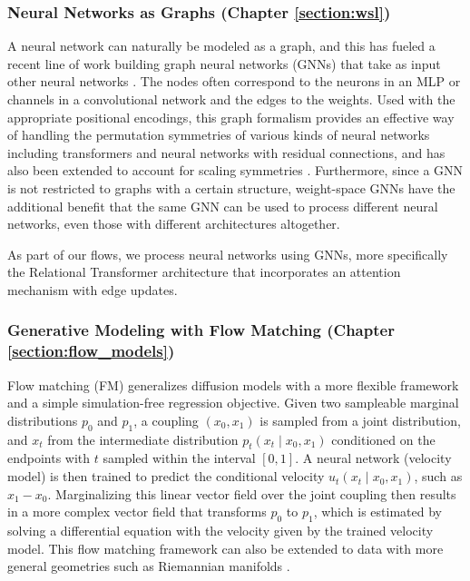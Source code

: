 \subsubsection{Neural Networks as Graphs (Chapter \ref{section:wsl})}

A neural network can naturally be modeled as a graph, and this has fueled a recent line of work building graph neural networks (GNNs) that take as input other neural networks \citep{kofinasGraphNeuralNetworks2024,limGraphMetanetworksProcessing2023,kalogeropoulosScaleEquivariantGraph2024}. The nodes often correspond to the neurons in an MLP or channels in a convolutional network and the edges to the weights. Used with the appropriate positional encodings, this graph formalism provides an effective way of handling the permutation symmetries of various kinds of neural networks including transformers and neural networks with residual connections, and has also been extended to account for scaling symmetries \citep{kalogeropoulosScaleEquivariantGraph2024}. Furthermore, since a GNN is not restricted to graphs with a certain structure, weight-space GNNs have the additional benefit that the same GNN can be used to process different neural networks, even those with different architectures altogether.

As part of our flows, we process neural networks using GNNs, more specifically the Relational Transformer architecture \citep{diaoRelationalAttentionGeneralizing2023,kofinasGraphNeuralNetworks2024} that incorporates an attention mechanism with edge updates. 

\subsubsection{Generative Modeling with Flow Matching (Chapter \ref{section:flow_models})}

Flow matching (FM) \citep{lipmanFlowMatchingGenerative2023,albergoStochasticInterpolantsUnifying2023,liuFlowStraightFast2022,tongImprovingGeneralizingFlowbased2023} generalizes diffusion models with a more flexible framework and a simple simulation-free regression objective. Given two sampleable marginal distributions $p_0$ and $p_1$, a coupling $(x_0, x_1)$ is sampled from a joint distribution, and $x_t$ from the intermediate distribution $p_t(x_t \mid x_0, x_1)$ conditioned on the endpoints with $t$ sampled within the interval $[0,1]$. A neural network (velocity model) is then trained to predict the conditional velocity $u_t(x_t \mid x_0, x_1)$, such as $x_1 - x_0$. Marginalizing this linear vector field over the joint coupling then results in a more complex vector field that transforms $p_0$ to $p_1$, which is estimated by solving a differential equation with the velocity given by the trained velocity model. This flow matching framework can also be extended to data with more general geometries such as Riemannian manifolds \citep{chenRiemannianFlowMatching2023}. 

